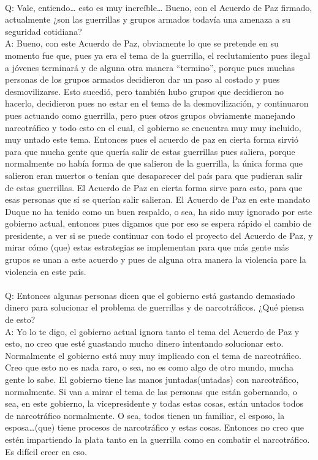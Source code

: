 \documentclass{phyasgn}\usepackage{nag}
\begin{document}
\\
Q: Vale, entiendo… esto es muy increíble… Bueno, con el Acuerdo de Paz firmado, actualmente ¿son las guerrillas y grupos armados todavía una amenaza a su seguridad cotidiana?\\
A: Bueno, con este Acuerdo de Paz, obviamente lo que se pretende en su momento fue que, pues ya era el tema de la guerrilla, el reclutamiento pues ilegal a jóvenes terminará y de alguna otra manera “termino”, porque pues muchas personas de los grupos armados decidieron dar un paso al costado y pues desmovilizarse. Esto sucedió, pero también hubo grupos que decidieron no hacerlo, decidieron pues no estar en el tema de la desmovilización, y continuaron pues actuando como guerrilla, pero pues otros grupos obviamente manejando narcotráfico y todo esto en el cual, el gobierno se encuentra muy muy incluido, muy untado este tema. Entonces pues el acuerdo de paz en cierta forma sirvió para que mucha gente que quería salir de estas guerrillas pues saliera, porque normalmente no había forma de que salieron de la guerrilla, la única forma que salieron eran muertos o tenían que desaparecer del país para que pudieran salir de estas guerrillas. El Acuerdo de Paz en cierta forma sirve para esto, para que esas personas que sí se querían salir salieran. El Acuerdo de Paz en este mandato Duque no ha tenido como un buen respaldo, o sea, ha sido muy ignorado por este gobierno actual, entonces pues digamos que por eso se espera rápido el cambio de presidente, a ver si se puede continuar con todo el proyecto del Acuerdo de Paz, y mirar cómo (que) estas estrategias se implementan para que más gente más grupos se unan a este acuerdo y pues de alguna otra manera la violencia pare la violencia en este país. \\
\\
Q: Entonces algunas personas dicen que el gobierno está gastando demasiado dinero para solucionar el problema de guerrillas y de narcotráficos. ¿Qué piensa de esto?\\
A: Yo lo te digo, el gobierno actual ignora tanto el tema del Acuerdo de Paz y esto, no creo que esté guastando mucho dinero intentando solucionar esto. Normalmente el gobierno está muy muy implicado con el tema de narcotráfico. Creo que esto no es nada raro, o sea, no es como algo de otro mundo, mucha gente lo sabe. El gobierno tiene las manos juntadas(untadas) con narcotráfico, normalmente. Si van a mirar el tema de las personas que están gobernando, o sea, en este gobierno, la vicepresidente y todas estas cosas, están untados todos de narcotráfico normalmente. O sea, todos tienen un familiar, el esposo, la esposa…(que) tiene procesos de narcotráfico y estas cosas. Entonces no creo que estén impartiendo la plata tanto en la guerrilla como en combatir el narcotráfico. Es difícil creer en eso. \\
\end{document}
